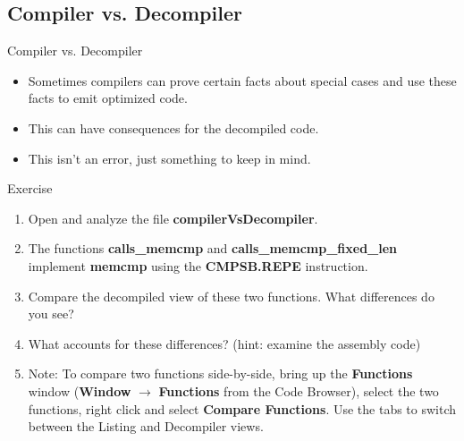 \documentclass{beamer}
\begin{document}
\subsection{Compiler vs. Decompiler}
\begin{frame}
\begin{block}{Compiler vs. Decompiler}
\begin{itemize}
\item Sometimes compilers can prove certain facts about special cases and use these facts to emit optimized code.
\item This can have consequences for the decompiled code.
\item This isn't an error, just something to keep in mind. 
\end{itemize}
\end{block}
\end{frame}

\begin{frame}
\begin{block}{Exercise}
\begin{enumerate}
\item Open and analyze the file \textbf{compilerVsDecompiler}.
\item The functions \textbf{calls\_memcmp} and \textbf{calls\_memcmp\_fixed\_len} implement \textbf{memcmp} using the \textbf{CMPSB.REPE} instruction.
\item Compare the decompiled view of these two functions.  What differences do you see?
\item What accounts for these differences? (hint: examine the assembly code)
\item Note: To compare two functions side-by-side, bring up the \textbf{Functions} window (\textbf{Window} $\rightarrow$ \textbf{Functions} from the Code Browser), select
the two functions, right click and select \textbf{Compare Functions}.  Use the tabs to switch between the Listing and Decompiler views.
\end{enumerate}
\end{block}
\end{frame}
\end{document}
